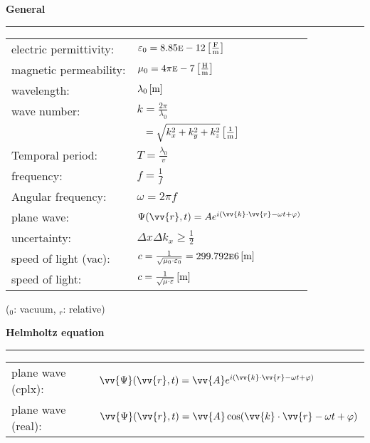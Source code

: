 
\vspace{2mm}
\normalsize\textbf{General}\small
\hrule
\vspace{2pt}
{
	\setlength{\extrarowheight}{4pt}
	\begin{tabular}{l l}
		electric permittivity: & $\varepsilon_0 = 8.85\textsc{e}-12 \unit[2]{\frac{F}{m}}$                         \\
		magnetic permeability: & $\mu_0=4\pi\textsc{e}-7 \unit[2]{\frac{H}{m}}$                                    \\
		wavelength:            & $\lambda_0 \unit[2]{m}$                                                           \\
		wave number:           & $k=\frac{2\pi}{\lambda_0}$                                                        \\
		                       & $\phantom{k } = \sqrt{k_x^2+k_y^2+k_z^2} \unit[2]{\frac{1}{m}}$                   \\
		Temporal period:       & $T = \frac{\lambda_0}{v}$                                                         \\
		frequency:             & $f= \frac{1}{f}$                                                                  \\
		Angular frequency:     & $\omega = 2\pi f$                                                                 \\
		plane wave:            & $\Psi(\vv{r},t) = Ae^{i(\vv{k}\cdot \vv{r} - \omega t + \varphi)}$                \\
		uncertainty:           & $\Delta x \Delta k_x \geq \frac{1}{2}$                                            \\
		speed of light (vac):  & $c = \frac{1}{\sqrt{\mu_0 \cdot \varepsilon_0}} = 299.792\textsc{e}6 \unit[2]{m}$ \\
		speed of light:        & $c = \frac{1}{\sqrt{\mu \cdot \varepsilon}} \unit[2]{m}$
	\end{tabular}\newline
}
($_0$: vacuum, $_r$: relative)

\vspace{2mm}
\normalsize\textbf{Helmholtz equation}\small
\hrule
{
	\setlength{\extrarowheight}{4pt}
	\begin{tabular}{l l}
		plane wave (cplx): & \tiny$\vv{\Psi}(\vv{r},t) = \vv{A}e^{i(\vv{k}\cdot \vv{r} - \omega t + \varphi)}$\small \\
		plane wave (real): & \tiny$\vv{\Psi}(\vv{r},t) = \vv{A}\cos(\vv{k}\cdot \vv{r} - \omega t + \varphi)$\small  \\
	\end{tabular}\newline
}


